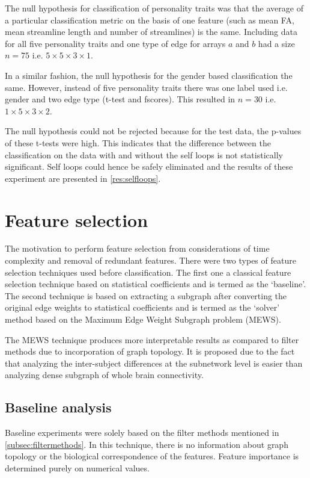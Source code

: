 \documentclass[msthesis.tex]{subfiles}
\begin{document}
The null hypothesis for classification of personality traits was that the average of a particular classification metric on the basis of one feature (such as mean FA, mean streamline length and number of streamlines) is the same. Including data for all five personality traits and one type of edge for arrays $a$ and $b$ had a size  $n=75$ i.e. $5\times 5 \times 3 \times 1$. 

In a similar fashion, the null hypothesis for the gender based classification the same. However, instead of five personality traits there was one label used i.e. gender and two edge type (t-test and fscores). This resulted in $n=30$ i.e. $1 \times 5 \times 3 \times 2$.

The null hypothesis could not be rejected because for the test data, the p-values of these t-tests were high. This indicates that the difference between the classification on the data with and without the self loops is not statistically significant. Self loops could hence be safely eliminated and the results of these experiment are presented in \autoref{res:selfloops}. 

\section{Feature selection} 
The motivation to perform feature selection from considerations of time complexity and removal of redundant features. There were two types of feature selection techniques used before classification. The first one a classical feature selection technique based on statistical coefficients and is termed as the `baseline'. The second technique is based on extracting a subgraph after converting the original edge weights to statistical coefficients and is termed as the `solver' method based on the Maximum Edge Weight Subgraph problem (MEWS). 

The MEWS technique produces more interpretable results as compared to filter methods due to incorporation of graph topology. It is proposed due to the fact that analyzing the inter-subject differences at the subnetwork level is easier than analyzing dense subgraph of whole brain connectivity. 

\subsection{Baseline analysis}

Baseline experiments were solely based on the filter methods mentioned in \autoref{subsec:filtermethods}. In this technique, there is no information about graph topology or the biological correspondence of the features. Feature importance is determined purely on numerical values.
\end{document}
